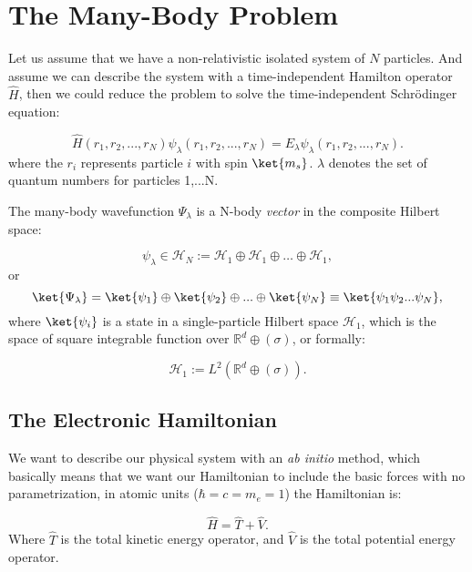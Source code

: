 \section{The Many-Body Problem}
\label{sec:many-body problem}
Let us assume that we have a non-relativistic isolated system of $N$ particles. And assume we can describe the system with a time-independent Hamilton operator $\hat{H}$, then we could reduce the problem to solve the time-independent Schr\"{o}dinger equation:

\begin{equation}
 \hat{H}(r_1, r_2,...,r_N)\psi_\lambda(r_1,r_2,...,r_N) = E_\lambda \psi_\lambda(r_1, r_2,...,r_N).
\label{def:manybodyschrodinger}
\end{equation}
%
where the $r_i$ represents particle $i$ with spin $\ket{m_s}$. $\lambda$ denotes the set of quantum numbers for particles 1,...N. 

The many-body wavefunction $\Psi_\lambda$ is a N-body \emph{vector} in the composite Hilbert space:

\begin{equation}
\psi_\lambda \in \mathcal{H}_N := \mathcal{H}_1 \oplus \mathcal{H}_1 \oplus \ldots \oplus \mathcal{H}_1,
  \label{maybodyinhilbert}
\end{equation}
%
or
\begin{equation}
\ket{\Psi_\lambda} = \ket{\psi_1}  \oplus \ket{\psi_2} \oplus ... \oplus \ket{\psi_N} \equiv \ket{\psi_1\psi_2 ... \psi_N},
 \label{def:productstates}
\end{equation}
%
where $\ket{\psi_i}$ is a state in a single-particle Hilbert space $\mathcal{H}_1$, which is the space of square integrable function over  
$\mathbb{R}^d \oplus (\sigma)$, or formally:

\begin{equation}
\mathcal{H}_1:= L^2(\mathbb{R}^d \oplus (\sigma)).
\label{hilbertspacedim}
\end{equation}
%
\subsection{The Electronic Hamiltonian}
We want to describe our physical system with an \emph{ab initio} method, which basically means that we want our Hamiltonian to include the basic forces with no parametrization, in atomic units ($\hbar = c = m_e = 1$) the Hamiltonian is:

\begin{equation}
\hat{H}  = \hat{T} + \hat{V}.
 \label{eq:tplussv}
\end{equation}
%
Where $\hat{T}$ is the total kinetic energy operator, and $\hat{V}$ is the total potential energy operator.
 
